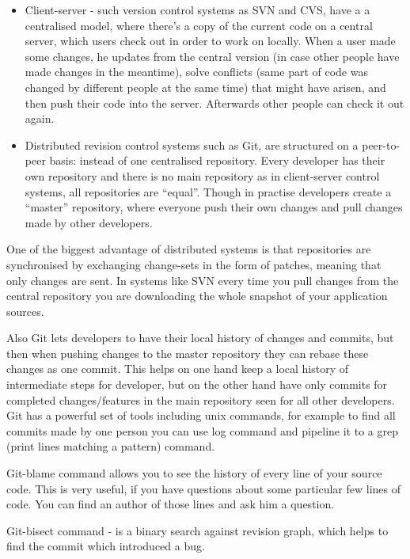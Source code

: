    \begin{itemize}
   \item Client-server - such version control systems as SVN and CVS, have a 
    a centralised model, where there's a copy of the current code on a central
    server, which users check out in order to work on locally. When a user made
    some changes, he updates from the central version (in case other people have
    made changes in the meantime), solve conflicts (same part of code was
    changed by different people at the same time) that might have arisen, and
    then push their code into the server. Afterwards other people can check it out again.

   \item Distributed revision control systems such as Git, are structured on a
    peer-to-peer basis: instead of one centralised repository. Every developer
    has their own repository and there is no main repository as in client-server
    control systems, all repositories are ``equal''. Though in practise developers
    create a ``master'' repository, where everyone push their own changes and pull
    changes made by other developers.
  \end{itemize}
  
  One of the biggest advantage of distributed systems is that repositories are
  synchronised by exchanging change-sets in the form of patches, meaning that 
  only changes are sent. In systems like SVN every time you pull changes from
  the central repository you are downloading the whole snapshot of your application sources.
  
  Also Git lets developers to have their local history of changes and commits,
  but then when pushing changes to the master repository they can rebase these changes as one commit.
  This helps on one hand keep a local history of intermediate steps for
  developer, but on the other hand have only commits for completed changes/features in the main repository
  seen for all other developers. Git has a powerful set of tools including unix commands,
  for example to find all commits made by one person you can use log command and pipeline it to a grep 
  (print lines matching a pattern) command.
  
   Git-blame command allows you to see the history of every line of your source
   code. This is very useful, if you have questions about some particular few lines of code.
   You can find an author of those lines and ask him a question.
   
   Git-bisect command - is a binary search against revision graph, which helps to find the commit which
   introduced a bug.

